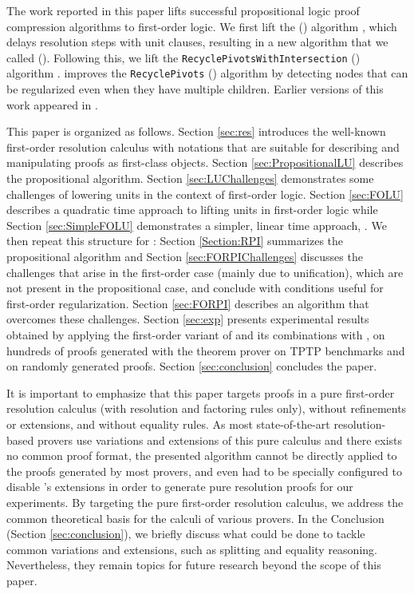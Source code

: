 The work reported in this paper lifts successful propositional logic proof compression algorithms to first-order logic. 
We first lift the {\LowerUnits} ({\LU}) algorithm \cite{LURPI}, which delays resolution steps with unit clauses, resulting in a new algorithm that we called {\SFOLowerUnits} ({\GFOLU}). 
Following this, we lift the \texttt{Recycle\-PivotsWithIntersection} ({\RPI}) algorithm \cite{LURPI}. 
\RPI improves the \texttt{RecyclePivots} ({\RP}) algorithm \cite{RP08} by detecting nodes that can be regularized even when they have multiple children.
Earlier versions of this work appeared in \cite{GFOLU,forpigcai}.

This paper is organized as follows. 
Section \ref{sec:res} introduces the well-known first-order resolution calculus with notations that are suitable for describing and manipulating proofs as first-class objects.
Section \ref{sec:PropositionalLU} describes the propositional \LowerUnits algorithm.
Section \ref{sec:LUChallenges} demonstrates some challenges of lowering units in the context of first-order logic.
Section \ref{sec:FOLU} describes a quadratic time approach to lifting units in first-order logic while Section \ref{sec:SimpleFOLU} demonstrates a simpler, linear time approach, \GFOLU.
We then repeat this structure for {\RPI}: Section \ref{Section:RPI} summarizes the propositional {\RPI} algorithm and Section \ref{sec:FORPIChallenges} discusses the challenges that arise in the first-order case (mainly due to unification), which are not present in the propositional case, and conclude with conditions useful for first-order regularization. 
Section \ref{sec:FORPI} describes an algorithm that overcomes these challenges. 
Section \ref{sec:exp} presents experimental results obtained by applying the first-order variant of \RPI and its combinations with {\GFOLU}, on hundreds of proofs generated with the {\SPASS} theorem prover on TPTP benchmarks \cite{TPTP} and on randomly generated proofs. 
Section \ref{sec:conclusion} concludes the paper.

It is important to emphasize that this paper targets proofs in a pure first-order resolution calculus (with resolution and factoring rules only), without refinements or extensions, and without equality rules. As most state-of-the-art resolution-based provers use variations and extensions of this pure calculus and there exists no common proof format, the presented algorithm cannot be directly applied to the proofs generated by most provers, and even {\SPASS} had to be specially configured to disable {\SPASS}'s extensions in order to generate pure resolution proofs for our experiments. By targeting the pure first-order resolution calculus, we address the common theoretical basis for the calculi of various provers. In the Conclusion (Section \ref{sec:conclusion}), we briefly discuss what could be done to tackle common variations and extensions, such as splitting and equality reasoning. Nevertheless, they remain topics for future research beyond the scope of this paper.
